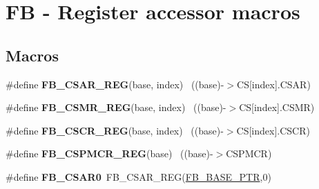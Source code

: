 \hypertarget{group___f_b___register___accessor___macros}{}\section{F\+B -\/ Register accessor macros}
\label{group___f_b___register___accessor___macros}
\subsection*{Macros}
\begin{DoxyCompactItemize}
\item 
\hypertarget{group___f_b___register___accessor___macros_gab4eabed8c463260d1811c99bf92b8aaa}{}\#define {\bfseries F\+B\+\_\+\+C\+S\+A\+R\+\_\+\+R\+E\+G}(base,  index)                                ~((base)-\/$>$C\+S\mbox{[}index\mbox{]}.C\+S\+A\+R)\label{group___f_b___register___accessor___macros_gab4eabed8c463260d1811c99bf92b8aaa}

\item 
\hypertarget{group___f_b___register___accessor___macros_gab85f399c0321b8598ed28acbb356e966}{}\#define {\bfseries F\+B\+\_\+\+C\+S\+M\+R\+\_\+\+R\+E\+G}(base,  index)                                ~((base)-\/$>$C\+S\mbox{[}index\mbox{]}.C\+S\+M\+R)\label{group___f_b___register___accessor___macros_gab85f399c0321b8598ed28acbb356e966}

\item 
\hypertarget{group___f_b___register___accessor___macros_ga103c332d2bf6b4de271753e3599d60de}{}\#define {\bfseries F\+B\+\_\+\+C\+S\+C\+R\+\_\+\+R\+E\+G}(base,  index)                                ~((base)-\/$>$C\+S\mbox{[}index\mbox{]}.C\+S\+C\+R)\label{group___f_b___register___accessor___macros_ga103c332d2bf6b4de271753e3599d60de}

\item 
\hypertarget{group___f_b___register___accessor___macros_ga6fe638cb9de1da832ed97ec78038e98f}{}\#define {\bfseries F\+B\+\_\+\+C\+S\+P\+M\+C\+R\+\_\+\+R\+E\+G}(base)                                        ~((base)-\/$>$C\+S\+P\+M\+C\+R)\label{group___f_b___register___accessor___macros_ga6fe638cb9de1da832ed97ec78038e98f}

\item 
\hypertarget{group___f_b___register___accessor___macros_ga444494eb7e637dcea435c4dc66ed7cd4}{}\#define {\bfseries F\+B\+\_\+\+C\+S\+A\+R0}~F\+B\+\_\+\+C\+S\+A\+R\+\_\+\+R\+E\+G(\hyperlink{group___f_b___peripheral_gace69013248279ed94480b3d6f6aa9fa6}{F\+B\+\_\+\+B\+A\+S\+E\+\_\+\+P\+T\+R},0)\label{group___f_b___register___accessor___macros_ga444494eb7e637dcea435c4dc66ed7cd4}


\end{DoxyCompactItemize}
